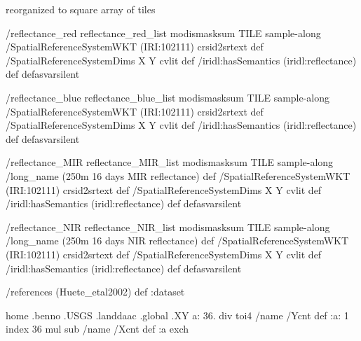 reorganized to square array of tiles
\begin{ingrid}
/reflectance_red
{reflectance_red_list
  modismasksum TILE sample-along
/SpatialReferenceSystemWKT (IRI:102111) crsid2srtext def
/SpatialReferenceSystemDims { X Y } cvlit def
/iridl:hasSemantics (iridl:reflectance) def
} defasvarsilent
\end{ingrid}
\begin{ingrid}
/reflectance_blue
{reflectance_blue_list
  modismasksum TILE sample-along
/SpatialReferenceSystemWKT (IRI:102111) crsid2srtext def
/SpatialReferenceSystemDims { X Y } cvlit def
/iridl:hasSemantics (iridl:reflectance) def
} defasvarsilent
\end{ingrid}
\begin{ingrid}
/reflectance_MIR
{reflectance_MIR_list
  modismasksum TILE sample-along
 /long_name (250m 16 days MIR reflectance) def
/SpatialReferenceSystemWKT (IRI:102111) crsid2srtext def
/SpatialReferenceSystemDims { X Y } cvlit def
/iridl:hasSemantics (iridl:reflectance) def
} defasvarsilent
\end{ingrid}
\begin{ingrid}
/reflectance_NIR
{reflectance_NIR_list
  modismasksum TILE sample-along
 /long_name (250m 16 days NIR reflectance) def
/SpatialReferenceSystemWKT (IRI:102111) crsid2srtext def
/SpatialReferenceSystemDims { X Y } cvlit def
/iridl:hasSemantics (iridl:reflectance) def
} defasvarsilent
\end{ingrid}
\begin{ingrid}
/references (Huete_etal2002) def
:dataset
\end{ingrid}

home .benno .USGS .landdaac .global .XY
  a:
    36. div
    toi4
    /name /Ycnt def
    :a: 1 index
      36 mul
      sub
     /name /Xcnt def
     :a
   exch


